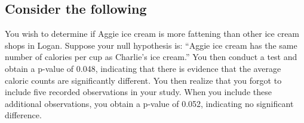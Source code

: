 \documentclass[12pt]{../notes}
\begin{document}


\begin{minipage}[l][2cm][c]{\textwidth}
\begin{comment}
\note{Another example: Is there a significant difference in the strength of concrete reinforced with rebar, vs concrete with no rebar?}
\end{comment}
\end{minipage}

\subsection*{Consider the following}

You wish to determine if Aggie ice cream is more fattening than other ice cream shops in Logan. Suppose your null hypothesis is: ``Aggie ice cream has the same number of calories per cup as Charlie's ice cream.'' You then conduct a test and obtain a p-value of 0.048, indicating that there is evidence that the average caloric counts are significantly different. You then realize that you forgot to include five recorded observations in your study. When you include these additional observations, you obtain a p-value of 0.052, indicating no significant difference. 

\nspace
{}

\begin{minipage}[l][3cm][c]{\textwidth}
\begin{comment}
\note{It depends. What is the cost of claiming a difference when there isn't one, versus the cost of claiming no difference when there is one?}

\nspace
\note{P-values should inform an analysis, rather than become the analysis.}
\end{comment}
\end{minipage}


\begin{minipage}[l][2cm][c]{\textwidth}
\begin{comment}
\note{If the expected value under the null hypothesis falls outside of a $x\%$ confidence interval, then we know that the p-value of the test statistic is less than $(100-x)\%$}. 
\end{comment}
\end{minipage}
\end{document}
